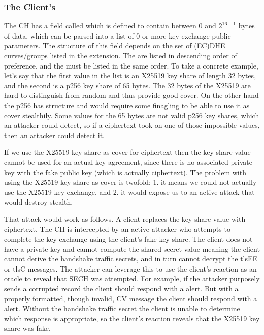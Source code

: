 \subsubsection{The Client's }
The \ac{CH} has a field called  which is defined to contain between $0$ and $2^{16-1}$ bytes of data,
which can be parsed into a list of 0 or more key exchange public parameters.
The structure of this field depends on the set of
(\ac{EC})\ac{DHE} curves/groups listed in the  extension.
The  are listed in descending order of preference,
and the  must be listed in the same order.
To take a concrete example, let's say that
the first value in the  list
is an \ac{X25519} key share of length 32 bytes,
and the second is a \ac{p256} key share of 65 bytes.
The 32 bytes of the \ac{X25519} are hard to distinguish from random and thus provide good cover.
On the other hand the \ac{p256} has structure and would require
some finagling to be able to use it as cover stealthily.
Some values for the 65 bytes are not valid \ac{p256} key shares,
which an attacker could detect, so if a ciphertext took on one of those
impossible values, then an attacker could detect it.

If we use the \ac{X25519} key share as cover for ciphertext
then the key share value cannot be used for an actual key agreement,
since there is no associated private key with the fake public key (which is
actually ciphertext).
The problem with using the \ac{X25519} key share as cover is twofold:
1. it means we could not actually use the \ac{X25519} key exchange, and 2. it would expose us to an active attack that would destroy stealth.

That attack would work as follows. A client replaces the key share
value with ciphertext. The \ac{CH} is intercepted by an active attacker
who attempts to complete the key exchange using the client's fake key share.
The client does not have a private key and cannot compute the shared secret value
meaning the client cannot derive the handshake traffic secrets,
and in turn cannot decrypt the \ac{tlsEE} or \ac{tlsC} messages.
The attacker can leverage this to use the client's reaction as an oracle
to reveal that \ac{SECH} was attempted.
For example, if the attacker purposely sends a corrupted record the client should respond
with a  alert.
But with a properly formatted,
though invalid, \ac{CV} message the client
should respond with a  alert.
Without the handshake traffic secret the client is unable to determine
which response is appropriate,
so the client's reaction reveals that
the \ac{X25519} key share was fake.

